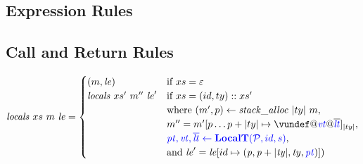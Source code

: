 \documentclass[acmsmall,review,anonymous]{acmart}\settopmatter{printfolios=true,printccs=false,printacmref=false}
\begin{document}
\subsection{Expression Rules}

\expressions

\subsection{Call and Return Rules}

\[\mathit{locals} ~ xs ~ \mem ~ \lenv =
\begin{cases}
  (\mem, \lenv) & \textnormal{if } xs = \varepsilon \\
  \mathit{locals} ~ xs' ~ \mem'' ~ \lenv' & \textnormal{if } xs = (id,ty)::xs' \\
  & \textnormal{where } (\mem',p) \leftarrow \mathit{stack\_alloc} ~ |ty| ~ \mem, \\
  & \mem'' = \mem'[p \dots p+|ty| \mapsto \vundef@\vt@\overline{\lt}]_{|ty|}, \\
  & \trule{\localtres}{\localt}, \\
  & \textnormal{and } \lenv' = \lenv[id \mapsto (\mathit{p, p+|ty|,ty,\pt})]) \\
\end{cases}\]

\mallocstep
\callexprstep
\callstep
\returnstep
\retvalstep
\retnovalstep
\end{document}
